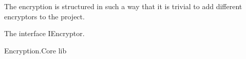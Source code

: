 The encryption is structured in such a way that it is trivial to add different encryptors to the project.

The interface IEncryptor.

Encryption.Core lib